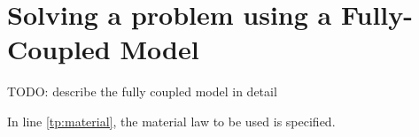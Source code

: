\section[Fully-coupled model]{Solving a problem using a Fully-Coupled Model}\label{tutorial-coupled}

TODO: describe the fully coupled model in detail


\begin{lst} \mbox{}

\end{lst}

In line \ref{tp:material}, the material law to be used is specified. 
